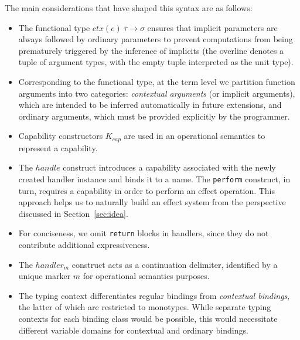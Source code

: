 \documentclass[acmsmall,review,screen]{acmart}
\newcommand{\ctx}[1]{ctx\left(#1\right)~}
\begin{document}
The main considerations that have shaped this syntax are as follows:
\begin{itemize}
    \item The functional type $\ctx{e}\overline{\tau}\to\sigma$ ensures that implicit parameters are always followed by ordinary parameters to prevent computations from being prematurely triggered by the inference of implicits (the overline denotes a tuple of argument types, with the empty tuple interpreted as the unit type).
    \item Corresponding to the functional type, at the term level we partition function arguments into two categories: \emph{contextual arguments} (or implicit arguments), which are intended to be inferred automatically in future extensions, and ordinary arguments, which must be provided explicitly by the programmer.
    \item Capability constructors $K_{cap}$ are used in an operational semantics to represent a capability.
    \item  The $handle$ construct introduces a capability associated with the newly created handler instance and binds it to a name.
    The \texttt{perform} construct, in turn, requires a capability in order to perform an effect operation.
    This approach helps us to naturally build an effect system from the perspective discussed in Section~\ref{sec:idea}.
    \item For conciseness, we omit \texttt{return} blocks in handlers, since they do not contribute additional expressiveness.
    \item The $handler_m$ construct acts as a continuation delimiter, identified by a unique marker $m$ for operational semantics purposes.
    \item The typing context differentiates regular bindings from \emph{contextual bindings}, the latter of which are restricted to monotypes.
    While separate typing contexts for each binding class would be possible, this would necessitate different variable domains for contextual and ordinary bindings.
\end{itemize}
\end{document}

